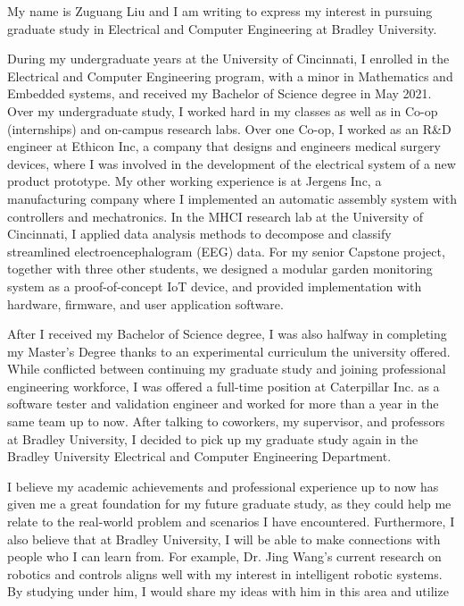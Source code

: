 \documentclass[a4paper]{article}
\begin{document}
\par My name is Zuguang Liu and I am writing to express my interest in pursuing
graduate study in Electrical and Computer Engineering at Bradley University.
\par During my undergraduate years at the University of Cincinnati, I enrolled
in the Electrical and Computer Engineering program, with a minor in Mathematics
and Embedded systems, and received my Bachelor of Science degree in May 2021.
Over my undergraduate study, I worked hard in my classes as well as in Co-op
(internships) and on-campus research labs.
Over one Co-op, I worked as an R\&D engineer at Ethicon Inc, a company that
designs and engineers medical surgery devices, where I was involved in
the development of the electrical system of a new product prototype.
My other working experience is at Jergens Inc, a manufacturing company where I
implemented an automatic assembly system with controllers and mechatronics.
In the MHCI research lab at the University of Cincinnati, I applied data
analysis methods to decompose and classify streamlined electroencephalogram
(EEG) data.
For my senior Capstone project, together with three other students, we designed
a modular garden monitoring system as a proof-of-concept IoT device, and
provided implementation with hardware, firmware, and user application software.
\par After I received my Bachelor of Science degree, I was also halfway in
completing my Master's Degree thanks to an experimental curriculum the
university offered.
While conflicted between continuing my graduate study and joining professional
engineering workforce, I was offered a full-time position at Caterpillar Inc. as
a software tester and validation engineer and worked for more than a year in the
same team up to now.
After talking to coworkers, my supervisor, and professors at Bradley University,
I decided to pick up my graduate study again in the Bradley University Electrical
and Computer Engineering Department.
\par I believe my academic achievements and professional experience up to now
has given me a great foundation for my future graduate study, as they could help
me relate to the real-world problem and scenarios I have encountered.
Furthermore, I also believe that at Bradley University, I will be able to make
connections with people who I can learn from.
For example, Dr. Jing Wang’s current research on robotics and controls aligns 
well with my interest in intelligent robotic systems.
By studying under him, I would share my ideas with him in this area and utilize
\end{document}
